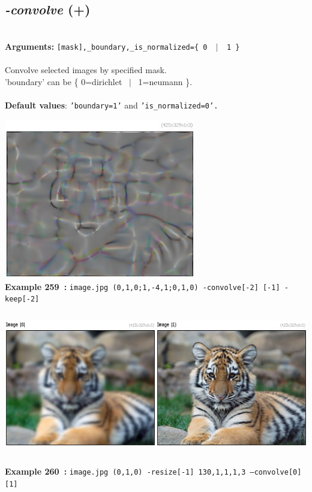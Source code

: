 \documentclass[a4paper,11pt,twoside]{book}
\begin{document}
\subsection{\emph{-convolve} (+)}\vspace*{-0.5em}
~\\\textbf{Arguments: } 
{\small \texttt{[mask],\_boundary,\_is\_normalized=\{ 0 ~$|$~ 1 \}}}\\~\\
Convolve selected images by specified mask.
~\\'boundary' can be \{ 0=dirichlet ~$|$~ 1=neumann \}.
~\\~\\\textbf{Default values}: {\small \texttt{'boundary=1'} and \texttt{'is\_normalized=0'.}}
\begin{center}\includegraphics[keepaspectratio=true,height=7cm,width=\textwidth]{img/gmic_def259.jpg}\\
{\footnotesize \textbf{Example 259~:} \texttt{image.jpg (0,1,0;1,-4,1;0,1,0) -convolve[-2] [-1] -keep[-2]}}
\\\includegraphics[keepaspectratio=true,height=7cm,width=\textwidth]{img/gmic_def260.jpg}\\
{\footnotesize \textbf{Example 260~:} \texttt{image.jpg (0,1,0) -resize[-1] 130,1,1,1,3 --convolve[0] [1]}}
\end{center}
\end{document}
